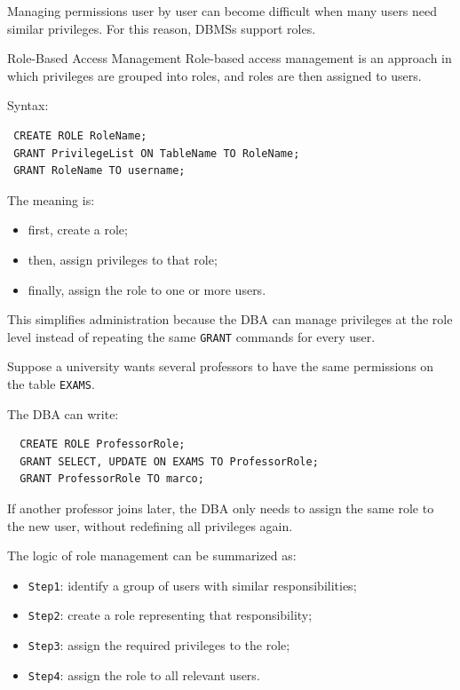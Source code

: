  Managing permissions user by user can become difficult when many users need similar privileges. For this reason, DBMSs support roles.

 \begin{defbox}{Role-Based Access Management}
  Role-based access management is an approach in which privileges are grouped into roles, and roles are then assigned to users.
 \end{defbox}

 Syntax:

 \begin{verbatim}
 CREATE ROLE RoleName;
 GRANT PrivilegeList ON TableName TO RoleName;
 GRANT RoleName TO username;
 \end{verbatim}
 \vspace{-0.4cm}

 The meaning is:
 \begin{itemize}
  \item first, create a role;
  \item then, assign privileges to that role;
  \item finally, assign the role to one or more users.
 \end{itemize}

 This simplifies administration because the DBA can manage privileges at the role level instead of repeating the same \texttt{GRANT} commands for every user.

 \vs

 \begin{example}
  Suppose a university wants several professors to have the same permissions on the table \texttt{EXAMS}.

  The DBA can write:
  \begin{verbatim}
  CREATE ROLE ProfessorRole;
  GRANT SELECT, UPDATE ON EXAMS TO ProfessorRole;
  GRANT ProfessorRole TO marco;
  \end{verbatim}
  \vspace{-0.4cm}

  If another professor joins later, the DBA only needs to assign the same role to the new user, without redefining all privileges again.

  The logic of role management can be summarized as:
  \begin{itemize}
   \item \texttt{Step1}: identify a group of users with similar responsibilities;
   \item \texttt{Step2}: create a role representing that responsibility;
   \item \texttt{Step3}: assign the required privileges to the role;
   \item \texttt{Step4}: assign the role to all relevant users.
  \end{itemize}
 \end{example}

